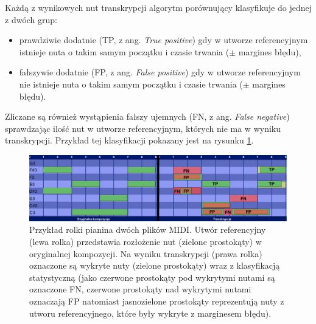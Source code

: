 \documentclass[12pt,a4paper,twoside]{mwart}
\begin{document}
Każdą z wynikowych nut transkrypcji algorytm porównujący klasyfikuje do jednej z dwóch grup:
\begin{itemize}
  \item prawdziwie dodatnie (TP, z ang. \textit{True positive}) gdy w utworze referencyjnym istnieje nuta o takim samym początku i czasie trwania ($\pm$ margines błędu),
  \item fałszywie dodatnie (FP, z ang. \textit{False positive}) gdy w utworze referencyjnym nie istnieje nuta o takim samym początku i czasie trwania ($\pm$ margines błędu).
\end{itemize} 
Zliczane są również wystąpienia fałszy ujemnych (FN, z ang. \textit{False negative}) sprawdzając ilość nut w utworze referencyjnym, których nie ma w wyniku transkrypcji. Przykład tej klasyfikacji pokazany jest na rysunku \ref{fig:f1}.

\begin{figure}[ht]
  \begin{center}
    \includegraphics[scale=0.21]{images/TranscriptionStatisticF1Measure.jpg}
    \caption{Przykład rolki pianina dwóch plików MIDI. Utwór referencyjny (lewa rolka) przedstawia rozłożenie nut (zielone prostokąty) w oryginalnej kompozycji. Na wyniku transkrypcji (prawa rolka) oznaczone są wykryte nuty (zielone prostokąty) wraz z klasyfikacją statystyczną (jako czerwone prostokąty pod wykrytymi nutami są oznaczone FN, czerwone prostokąty nad wykrytymi nutami oznaczają FP natomiast jasnozielone prostokąty reprezentują nuty z utworu referencyjnego, które były wykryte z marginesem błędu).}
    \label{fig:f1}
  \end{center}
\end{figure}
\end{document}
